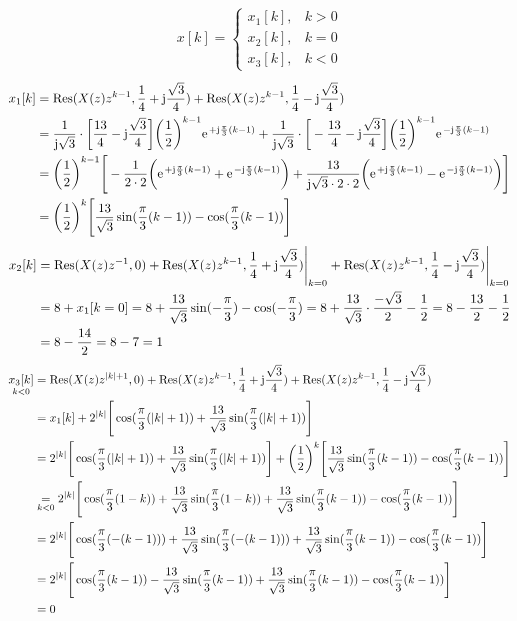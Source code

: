 \begin{align}
	x[k]=\begin{cases}
		x_1[k], &k>0 \\
		x_2[k], &k=0 \\
		x_3[k], &k<0
	\end{cases}
\end{align}
\begin{align}
	x_1[k]&=\mathrm{Res}(X(z)z^{k-1},\frac{1}{4}+\im\frac{\sqrt{3}}{4})+\mathrm{Res}(X(z)z^{k-1},\frac{1}{4}-\im\frac{\sqrt{3}}{4})\nonumber\\
	&=\frac{1}{\im\sqrt{3}}\cdot\bigg [\frac{13}{4}-\im\frac{\sqrt{3}}{4}\bigg]\bigg(\frac{1}{2}\bigg)^{k-1}\e^{+\im\frac{\pi}{3}(k-1)}+\frac{1}{\im\sqrt{3}}\cdot\bigg [-\frac{13}{4}-\im\frac{\sqrt{3}}{4}\bigg]\bigg(\frac{1}{2}\bigg)^{k-1}\e^{-\im\frac{\pi}{3}(k-1)}\nonumber\\
	&=\bigg(\frac{1}{2}\bigg)^{k-1}\Bigg[-\frac{1}{2\cdot2}\bigg(\e^{+\im\frac{\pi}{3}(k-1)}+\e^{-\im\frac{\pi}{3}(k-1)}\bigg)+\frac{13}{\im\sqrt{3}\cdot2\cdot2}\bigg(\e^{+\im\frac{\pi}{3}(k-1)}-\e^{-\im\frac{\pi}{3}(k-1)}\bigg)\Bigg]\nonumber\\
	&=\bigg(\frac{1}{2}\bigg)^{k}\Bigg[\frac{13}{\sqrt{3}}\sin(\frac{\pi}{3}(k-1))-\cos(\frac{\pi}{3}(k-1))\Bigg]
\end{align}
\begin{align}
	x_2[k]&=\mathrm{Res}(X(z)z^{-1},0)+\mathrm{Res}(X(z)z^{k-1},\frac{1}{4}+\im\frac{\sqrt{3}}{4})\Bigg |_{k=0}+\mathrm{Res}(X(z)z^{k-1},\frac{1}{4}-\im\frac{\sqrt{3}}{4})\Bigg |_{k=0}\nonumber\\
	&=8+x_1[k=0]=8+\frac{13}{\sqrt{3}}\sin(-\frac{\pi}{3})-\cos(-\frac{\pi}{3})=8+\frac{13}{\sqrt{3}}\cdot\frac{-\sqrt{3}}{2}-\frac{1}{2}=8-\frac{13}{2}-\frac{1}{2}\nonumber\\
	&=8-\frac{14}{2}=8-7=1
\end{align}
\begin{align}
	\underset{k<0}{x_3[k]}&=\mathrm{Res}(X(z)z^{|k|+1},0)+\mathrm{Res}(X(z)z^{k-1},\frac{1}{4}+\im\frac{\sqrt{3}}{4})+\mathrm{Res}(X(z)z^{k-1},\frac{1}{4}-\im\frac{\sqrt{3}}{4})\nonumber\\
	&=x_1[k]+2^{|k|}\Bigg[\cos(\frac{\pi}{3}(|k|+1))+\frac{13}{\sqrt{3}}\sin(\frac{\pi}{3}(|k|+1))\Bigg]\nonumber\\
	&=2^{|k|}\Bigg[\cos(\frac{\pi}{3}(|k|+1))+\frac{13}{\sqrt{3}}\sin(\frac{\pi}{3}(|k|+1))\Bigg]+\bigg(\frac{1}{2}\bigg)^{k}\Bigg[\frac{13}{\sqrt{3}}\sin(\frac{\pi}{3}(k-1))-\cos(\frac{\pi}{3}(k-1))\Bigg]\nonumber\\
	&\underset{k<0}{=}2^{|k|}\Bigg[\cos(\frac{\pi}{3}(1-k))+\frac{13}{\sqrt{3}}\sin(\frac{\pi}{3}(1-k))+\frac{13}{\sqrt{3}}\sin(\frac{\pi}{3}(k-1))-\cos(\frac{\pi}{3}(k-1))\Bigg]\nonumber\\
	&=2^{|k|}\Bigg[\cos(\frac{\pi}{3}(-(k-1)))+\frac{13}{\sqrt{3}}\sin(\frac{\pi}{3}(-(k-1)))+\frac{13}{\sqrt{3}}\sin(\frac{\pi}{3}(k-1))-\cos(\frac{\pi}{3}(k-1))\Bigg]\nonumber\\
	&=2^{|k|}\Bigg[\cos(\frac{\pi}{3}(k-1))-\frac{13}{\sqrt{3}}\sin(\frac{\pi}{3}(k-1))+\frac{13}{\sqrt{3}}\sin(\frac{\pi}{3}(k-1))-\cos(\frac{\pi}{3}(k-1))\Bigg] \nonumber\\
	&=0
\end{align}
